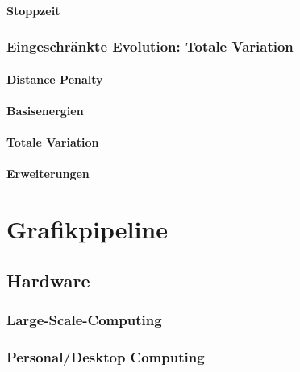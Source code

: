 \documentclass[a4paper, 11pt, accentcolor = tud3b]{tudreport}
\begin{document}
				\subsubsection{Stoppzeit} %

			\subsection{Eingeschränkte Evolution: Totale Variation} %

				\subsubsection{Distance Penalty} %

				\subsubsection{Basisenergien} %

				\subsubsection{Totale Variation} %

				\subsubsection{Erweiterungen} %

	\chapter{Grafikpipeline} %

		\section{Hardware} %

			\subsection{Large-Scale-Computing} %

			\subsection{Personal/Desktop Computing} %
\end{document}

